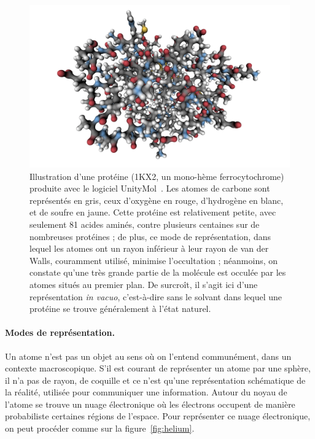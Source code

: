     \begin{figure}[htb]
		\centering
		\includegraphics[width=\textwidth]{figures/ch1/1KX2}
		\caption{Illustration d'une protéine (1KX2, un mono-hème ferrocytochrome) produite avec le logiciel UnityMol~\cite{doutreligne2014unitymol}. Les atomes de carbone sont représentés en gris, ceux d'oxygène en rouge, d'hydrogène en blanc, et de soufre en jaune. Cette protéine est relativement petite, avec seulement 81 acides aminés, contre plusieurs centaines sur de nombreuses protéines ; de plus, ce mode de représentation, dans lequel les atomes ont un rayon inférieur à leur rayon de van der Walls, couramment utilisé, minimise l'occultation ; néanmoins, on constate qu'une très grande partie de la molécule est occulée par les atomes situés au premier plan. De surcroît, il s'agit ici d'une représentation \emph{in vacuo}, c'est-à-dire sans le solvant dans lequel une protéine se trouve généralement à l'état naturel.}
		\label{fig:1KX2}
	\end{figure}
	
	\paragraph{Modes de représentation.}
	Un atome n'est pas un objet au sens où on l'entend communément, dans un contexte macroscopique. S'il est courant de représenter un atome par une sphère, il n'a pas de rayon, de \og coquille \fg{} et ce n'est qu'une représentation schématique de la réalité, utilisée pour communiquer une information. Autour du noyau de l'atome se trouve un nuage électronique où les électrons occupent de manière probabiliste certaines régions de l'espace. Pour représenter ce nuage électronique, on peut procéder comme sur la figure~\ref{fig:helium}.
	
